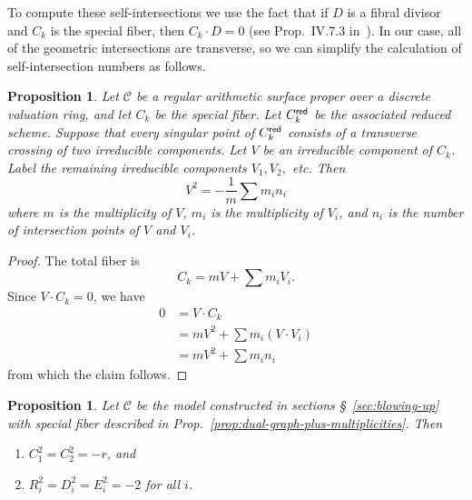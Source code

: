 \documentclass[reqno]{amsart}
\newtheorem{proposition}[thm]{Proposition}
\theoremstyle{definition}
\theoremstyle{remark}
\def\scd{\mathscr{C}}
\begin{document}
To compute these self-intersections we use the fact that if $D$ is a fibral divisor and $C_k$ is the special fiber, then $C_k \cdot D = 0$ (see Prop.~IV.7.3 in~\cite{silvermanATAEC}). In our case, all of the geometric intersections are transverse, so we can simplify the calculation of self-intersection numbers as follows.
\begin{proposition}\label{prop:transverse-self-intersections}
  Let $\scd$ be a regular arithmetic surface proper over a discrete valuation ring, and let $C_k$ be the special fiber. Let $C_k^{\sf red}$ be the associated reduced scheme. Suppose that every singular point of $C_k^{\sf red}$ consists of a transverse crossing of two irreducible components. Let $V$ be an irreducible component of $C_k$. Label the remaining irreducible components $V_1, V_2,$ etc. Then
  \[
  V^2 = -\frac{1}{m} \sum m_i n_i
  \]
  where $m$ is the multiplicity of $V$, $m_i$ is the multiplicity of $V_i$, and $n_i$ is the number of intersection points of $V$ and $V_i$.
\end{proposition}

\begin{proof}
  The total fiber is
  \[
  C_k = mV + \sum m_i V_i.
  \]
  Since $V \cdot C_k = 0$, we have
  \begin{align*}
    0 &= V \cdot C_k \\
    &= mV^2 + \sum m_i (V \cdot V_i) \\
    &= mV^2 + \sum m_i n_i
  \end{align*}
  from which the claim follows.
\end{proof}

\begin{proposition}\label{prop:self-intersect-superelliptic}
  Let $\scd$ be the model constructed in sections \S~\ref{sec:blowing-up} with special fiber described in Prop.~\ref{prop:dual-graph-plus-multiplicities}. Then
  \begin{enumerate}
      \item $C_1^2 = C_2^2 = -r$, and
      \item $R_i^2 = D_i^2 = E_i^2 = -2$ for all $i$.
  \end{enumerate}
\end{proposition}
\end{document}
